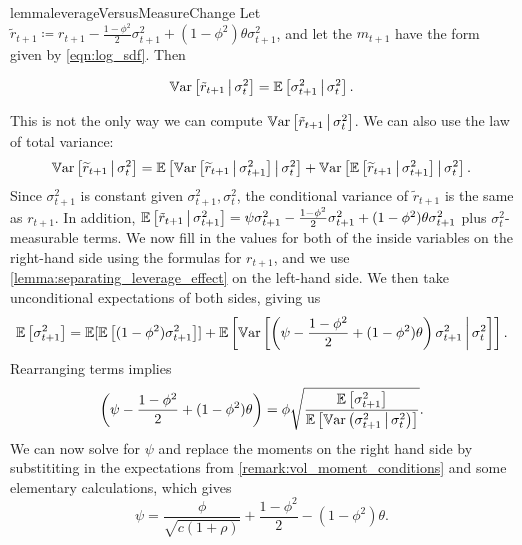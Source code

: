 \documentclass[11pt, letterpaper, twoside]{article}
\begin{document}
\begin{restatable}{lemma}{leverageVersusMeasureChange}
    \label{lemma:separating_leverage_effect}
%    
    Let $\tilde{r}_{t+1} \coloneqq r_{t+1} - \frac{1 - \phi^2}{2} \sigma^2_{t+1} + (1 - \phi^2) \theta \sigma^2_{t+1}$, and let the $m_{t+1}$ have the form given by \cref{eqn:log_sdf}. Then 
    
    \begin{equation}
       \operatorname{\mathbb{V}ar}\left[\tilde{r}_{t+1} \,\middle\vert\, \sigma^2_t \right] = \operatorname{\mathbb{E}}\left[\sigma^2_{t+1} \,\middle\vert\, \sigma^2_t\right].
    \end{equation}
\end{restatable}
%
This is not the only way we can compute $\operatorname{\mathbb{V}ar}\left[\tilde{r}_{t+1} \,\middle\vert\, \sigma^2_t \right]$.  We can also use the law of total variance:
%
\begin{equation}
    \operatorname{\mathbb{V}ar}\left[\widetilde{r}_{t+1} \,\middle\vert\, \sigma^2_t\right] = \operatorname{\mathbb{E}}\left[\operatorname{\mathbb{V}ar}\left[\widetilde{r}_{t+1} \,\middle\vert\, \sigma^2_{t+1}\right] \,\middle\vert\, \sigma_t^2 \right] + \operatorname{\mathbb{V}ar}\left[\operatorname{\mathbb{E}}\left[\widetilde{r}_{t+1}\,\middle\vert\, \sigma_{t+1}^2\right] \,\middle\vert\, \sigma^2_t\right].
\end{equation}
%
Since $\sigma^2_{t+1}$ is constant given $\sigma^2_{t+1}, \sigma^2_t$, the conditional variance of $\widetilde{r}_{t+1}$ is the same as $r_{t+1}$. In addition, $\operatorname{\mathbb{E}}\left[\tilde{r}_{t+1} \,\middle\vert\, \sigma^2_{t+1}\right] = \psi \sigma^2_{t+1} - \frac{1-\phi^2}{2} \sigma^2_{t+1} + (1- \phi^2) \theta \sigma^2_{t+1}$ plus $\sigma^2_t$-measurable terms. We now fill in the values for both of the inside variables on the right-hand side using the formulas for $r_{t+1}$, and we use \cref{lemma:separating_leverage_effect} on the left-hand side. We then take unconditional expectations of both sides, giving us
%
\begin{equation}
    \operatorname{\mathbb{E}}\left[\sigma^2_{t+1} \right] = \operatorname{\mathbb{E}}[ \operatorname{\mathbb{E}}\left[(1 - \phi^2) \sigma^2_{t+1} \right]] + \operatorname{\mathbb{E}}\left[\operatorname{\mathbb{V}ar}\left[\left(\psi - \frac{1-\phi^2}{2} + (1-\phi^2)\theta\right) \sigma^2_{t+1} \,\middle\vert\, \sigma^2_t\right]\right].
\end{equation}
%
Rearranging terms implies 
%
\begin{equation}
    \label{eqn:psi_tilde_eqn}
    \left(\psi - \frac{1-\phi^2}{2} + (1-\phi^2)\theta\right) = \phi \sqrt{\frac{\operatorname{\mathbb{E}}\left[\sigma^2_{t+1} \right]}{\operatorname{\mathbb{E}} \left[\operatorname{\mathbb{V}ar}\left(\sigma^2_{t+1} \,\middle\vert\, \sigma^2_t\right)\right]}}.
\end{equation}
%
We can now solve for $\psi$ and replace the moments on the right hand side by substititing in the expectations from \cref{remark:vol_moment_conditions} and some elementary calculations, which gives 
%
\begin{equation}
    \label{eqn:psi_pp_as_func_of_params}
    \psi = \frac{\phi}{\sqrt{c (1 + \rho)}} + \frac{1 - \phi^2}{2} - (1 - \phi^2) \theta.
\end{equation}
\end{document}
